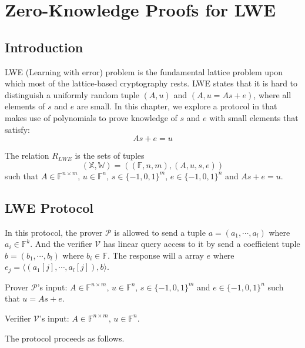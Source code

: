 \chapter{Zero-Knowledge Proofs for LWE}

\section{Introduction}

LWE (Learning with error) problem is the fundamental lattice problem upon which most of the lattice-based cryptography rests. LWE states that it is hard to distinguish a uniformly random tuple $(A, u)$ and $(A, u = As+e)$, where all elements of $s$ and $e$ are small. In this chapter, we explore a protocol in \cite{lwe} that makes use of polynomials to prove knowledge of $s$ and $e$ with small elements that satisfy:
$$
    As + e = u
$$

\begin{definition}
The relation $R_{LWE}$ is the sets of tuples
$$
    (\mathbb{X}, \mathbb{W}) = ((\mathbb{F}, n, m), (A, u, s, e))
$$ 
such that $A \in \mathbb{F}^{n \times m}$, $u \in \mathbb{F}^{n}$, $s \in \{-1, 0, 1\}^{m}$, $e \in \{-1, 0, 1\}^{n}$ and $As + e = u$.
\end{definition}

\section{LWE Protocol}

In this protocol, the prover $\mathcal{P}$ is allowed to send a tuple $a = (a_1, \cdots, a_l)$ where $a_i \in \mathbb{F}^k$. And the verifier $\mathcal{V}$ has linear query access to it by send a coefficient tuple $b = (b_1, \cdots, b_l)$ where $b_i \in \mathbb{F}$. The response will a array $e$ where $e_j = \langle (a_1[j], \cdots, a_l[j]), b  \rangle$.

Prover $\mathcal{P}$'s input: $A \in \mathbb{F}^{n \times m}$, $u \in \mathbb{F}^{n}$, $s \in \{-1, 0, 1\}^{m}$ and $e \in \{-1, 0, 1\}^{n}$ such that $u = As + e$.

Verifier $\mathcal{V}$'s input: $A \in \mathbb{F}^{n \times m}$, $u \in \mathbb{F}^{n}$.

The protocol proceeds as follows.



